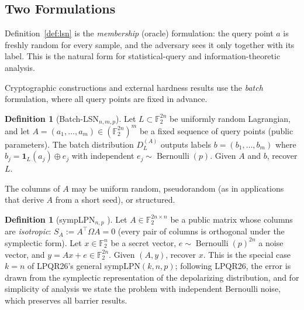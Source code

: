\documentclass[11pt,a4paper]{article}
\theoremstyle{plain}
\theoremstyle{definition}
\newtheorem{definition}[theorem]{Definition}
\newcommand{\F}{\mathbb{F}}
\begin{document}
\subsection{Two Formulations}
\label{subsec:two-forms}

Definition~\ref{def:lsn} is the \emph{membership} (oracle) formulation: the query point $a$ is freshly random for every sample, and the adversary sees it only together with its label. This is the natural form for statistical-query and information-theoretic analysis.

Cryptographic constructions and external hardness results use the \emph{batch} formulation, where all query points are fixed in advance.

\begin{definition}[Batch-LSN$_{n,m,p}$]
\label{def:lsn-batch}
Let $L \subset \F_2^{2n}$ be uniformly random Lagrangian, and let $A = (a_1,\dots,a_m) \in (\F_2^{2n})^m$ be a fixed sequence of query points (public parameters). The batch distribution $D_L^{(A)}$ outputs labels $b = (b_1,\dots,b_m)$ where $b_j = \mathbf{1}_L(a_j) \oplus e_j$ with independent $e_j \sim \operatorname{Bernoulli}(p)$. Given $A$ and $b$, recover $L$.
\end{definition}

The columns of $A$ may be uniform random, pseudorandom (as in applications that derive $A$ from a short seed), or structured.

\begin{definition}[sympLPN$_{n,p}$ \cite{KLP+25,LPQR26}]
\label{def:symplpn}
Let $A \in \F_2^{2n \times n}$ be a public matrix whose columns are \emph{isotropic}: $S_A := A^{\top}\Omega A = 0$ (every pair of columns is orthogonal under the symplectic form). Let $x \in \F_2^n$ be a secret vector, $e \sim \operatorname{Bernoulli}(p)^{2n}$ a noise vector, and $y = Ax + e \in \F_2^{2n}$. Given $(A,y)$, recover $x$.
This is the special case $k=n$ of LPQR26's general sympLPN$(k,n,p)$; following LPQR26, the error is drawn from the symplectic representation of the depolarizing distribution, and for simplicity of analysis we state the problem with independent Bernoulli noise, which preserves all barrier results.
\end{definition}
\end{document}
